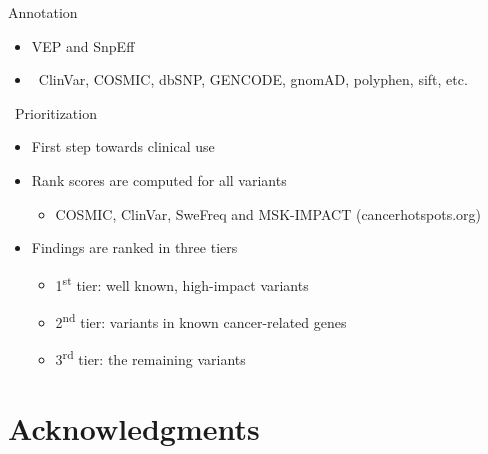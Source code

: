 \documentclass[usepdftitle=false]{beamer}
\newcommand{\ts}{\textsuperscript}
\begin{document}
\begin{frame}{Annotation}
	\begin{itemize}
		\item VEP and SnpEff
		\item \faDatabase\ ClinVar, COSMIC, dbSNP, GENCODE, gnomAD, polyphen, sift, etc.
	\end{itemize}
\end{frame}


\begin{frame}{\faWrench\ Prioritization}
	\begin{itemize}
		\item	First step towards clinical use
		\item	Rank scores are computed for all variants
		\begin{itemize}
			\item	COSMIC, ClinVar, SweFreq and MSK-IMPACT (cancerhotspots.org)
		\end{itemize}
		\item	Findings are ranked in three tiers
		\begin{itemize}
			\item	1\ts{st} tier: well known, high-impact variants
			\item	2\ts{nd} tier: variants in known cancer-related genes
			\item	3\ts{rd} tier: the remaining variants
		\end{itemize}
	\end{itemize}
\end{frame}

\section{Acknowledgments}
\end{document}
